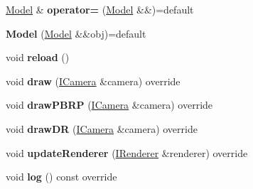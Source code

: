 \begin{DoxyCompactItemize}
\item 
\mbox{\label{classflw_1_1flf_1_1Model_a1b070368285cca4a99b9749b9cde74d6}} 
\hyperlink{classflw_1_1flf_1_1Model}{Model} \& {\bfseries operator=} (\hyperlink{classflw_1_1flf_1_1Model}{Model} \&\&)=default
\item 
\mbox{\label{classflw_1_1flf_1_1Model_ac9e9ca4164ca96cd4a0c373f7c0cc0a9}} 
{\bfseries Model} (\hyperlink{classflw_1_1flf_1_1Model}{Model} \&\&obj)=default
\item 
\mbox{\label{classflw_1_1flf_1_1Model_a98eea53380bf63f1d9555e55aefb9fce}} 
void {\bfseries reload} ()
\item 
\mbox{\label{classflw_1_1flf_1_1Model_a33409f7997ffc520cd0de10e1622659b}} 
void {\bfseries draw} (\hyperlink{classflw_1_1flf_1_1ICamera}{I\+Camera} \&camera) override
\item 
\mbox{\label{classflw_1_1flf_1_1Model_aed705f08ce1c14655adf57e6a383b91d}} 
void {\bfseries draw\+P\+B\+RP} (\hyperlink{classflw_1_1flf_1_1ICamera}{I\+Camera} \&camera) override
\item 
\mbox{\label{classflw_1_1flf_1_1Model_a6b1f0f8aa0af922b24283c85690eeecb}} 
void {\bfseries draw\+DR} (\hyperlink{classflw_1_1flf_1_1ICamera}{I\+Camera} \&camera) override
\item 
\mbox{\label{classflw_1_1flf_1_1Model_a2dc3e1aa1d2d3d923987cfc4a06a5137}} 
void {\bfseries update\+Renderer} (\hyperlink{classflw_1_1flf_1_1IRenderer}{I\+Renderer} \&renderer) override
\item 
\mbox{\label{classflw_1_1flf_1_1Model_ac17d4806eff1a0166efcb62be9a7eca0}} 
void {\bfseries log} () const override
\end{DoxyCompactItemize}
